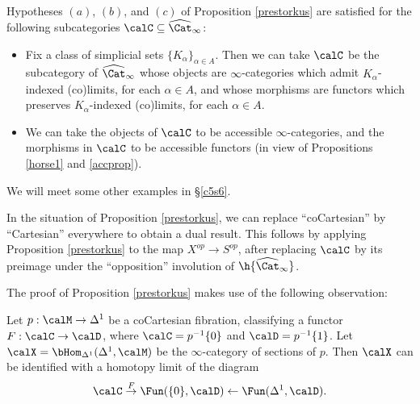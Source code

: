 \begin{remark}
Hypotheses $(a)$, $(b)$, and $(c)$ of Proposition \ref{prestorkus} are satisfied for the following subcategories $\calC \subseteq \widehat{\Cat}_{\infty}$:
\begin{itemize}
\item Fix a class of simplicial sets $\{ K_{\alpha} \}_{\alpha \in A}$. Then we can take $\calC$ be the subcategory of
$\widehat{\Cat}_{\infty}$ whose objects are $\infty$-categories which admit $K_{\alpha}$-indexed (co)limits, for each $\alpha \in A$, and whose morphisms are functors which preserves $K_{\alpha}$-indexed (co)limits, for each $\alpha \in A$.
\item We can take the objects of $\calC$ to be accessible $\infty$-categories, and the morphisms in $\calC$ to be accessible functors (in view of Propositions \ref{horse1} and \ref{accprop}).
\end{itemize}
We will meet some other examples in \S \ref{c5s6}.
\end{remark}

\begin{remark}
In the situation of Proposition \ref{prestorkus}, we can replace ``coCartesian'' by ``Cartesian'' everywhere to obtain a dual result. This follows by applying Proposition \ref{prestorkus} to the map $X^{op} \rightarrow S^{op}$, after replacing $\calC$ by its preimage under the ``opposition'' involution of $\h{ \widehat{\Cat}_{\infty}}$.
\end{remark}

The proof of Proposition \ref{prestorkus} makes use of the following observation:

\begin{lemma}\label{surgem}
Let $p: \calM \rightarrow \Delta^1$ be a coCartesian fibration, classifying a functor
$F: \calC \rightarrow \calD$, where $\calC = p^{-1} \{0\}$ and $\calD = p^{-1} \{1\}$. 
Let $\calX = \bHom_{\Delta^1}( \Delta^1, \calM)$ be the $\infty$-category of sections of $p$.
Then $\calX$ can be identified with a homotopy limit of the diagram
$$ \calC \stackrel{F}{\rightarrow} \Fun( \{0\}, \calD) \leftarrow \Fun(\Delta^1, \calD).$$
\end{lemma}

